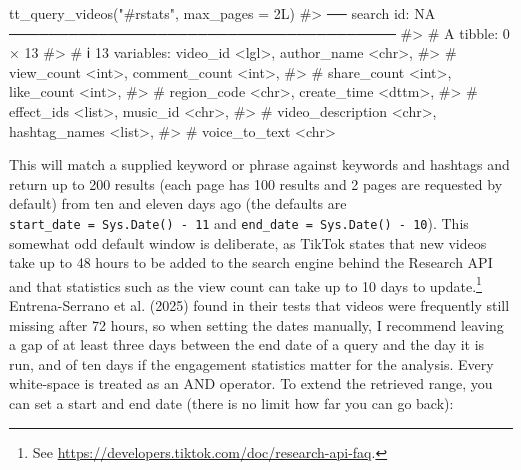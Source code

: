 \documentclass[
  nobib]{ccr}
\newenvironment{Shaded}{\begin{snugshade}}{\end{snugshade}}
\newcommand{\AttributeTok}[1]{\textcolor[rgb]{0.40,0.45,0.13}{#1}}
\newcommand{\CommentTok}[1]{\textcolor[rgb]{0.37,0.37,0.37}{#1}}
\newcommand{\DecValTok}[1]{\textcolor[rgb]{0.68,0.00,0.00}{#1}}
\newcommand{\FunctionTok}[1]{\textcolor[rgb]{0.28,0.35,0.67}{#1}}
\newcommand{\NormalTok}[1]{\textcolor[rgb]{0.00,0.23,0.31}{#1}}
\newcommand{\StringTok}[1]{\textcolor[rgb]{0.13,0.47,0.30}{#1}}
\begin{document}
\begin{Shaded}
\begin{Highlighting}[]
\FunctionTok{tt\_query\_videos}\NormalTok{(}\StringTok{"\#rstats"}\NormalTok{, }\AttributeTok{max\_pages =} \DecValTok{2}\NormalTok{L)}
\CommentTok{\#\textgreater{} ── search id: NA ───────────────────────────────────────}
\CommentTok{\#\textgreater{} \# A tibble: 0 × 13}
\CommentTok{\#\textgreater{} \# ℹ 13 variables: video\_id \textless{}lgl\textgreater{}, author\_name \textless{}chr\textgreater{},}
\CommentTok{\#\textgreater{} \#   view\_count \textless{}int\textgreater{}, comment\_count \textless{}int\textgreater{},}
\CommentTok{\#\textgreater{} \#   share\_count \textless{}int\textgreater{}, like\_count \textless{}int\textgreater{},}
\CommentTok{\#\textgreater{} \#   region\_code \textless{}chr\textgreater{}, create\_time \textless{}dttm\textgreater{},}
\CommentTok{\#\textgreater{} \#   effect\_ids \textless{}list\textgreater{}, music\_id \textless{}chr\textgreater{},}
\CommentTok{\#\textgreater{} \#   video\_description \textless{}chr\textgreater{}, hashtag\_names \textless{}list\textgreater{},}
\CommentTok{\#\textgreater{} \#   voice\_to\_text \textless{}chr\textgreater{}}
\end{Highlighting}
\end{Shaded}

This will match a supplied keyword or phrase against keywords and
hashtags and return up to 200 results (each page has 100 results and 2
pages are requested by default) from ten and eleven days ago (the
defaults are \texttt{start\_date\ =\ Sys.Date()\ -\ 11} and
\texttt{end\_date\ =\ Sys.Date()\ -\ 10}). This somewhat odd default
window is deliberate, as TikTok states that new videos take up to 48
hours to be added to the search engine behind the Research API and that
statistics such as the view count can take up to 10 days to
update.\footnote{See
  \url{https://developers.tiktok.com/doc/research-api-faq}.}
Entrena-Serrano et al. (2025) found in their tests that videos were
frequently still missing after 72 hours, so when setting the dates
manually, I recommend leaving a gap of at least three days between the
end date of a query and the day it is run, and of ten days if the
engagement statistics matter for the analysis. Every white-space is
treated as an AND operator. To extend the retrieved range, you can set a
start and end date (there is no limit how far you can go back):
\end{document}

